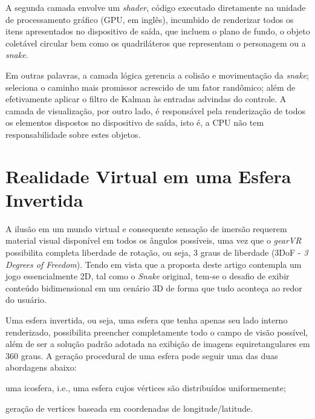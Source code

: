 \documentclass{vgtc}                          %
\begin{document}
A segunda camada envolve um \textit{shader}, código executado diretamente na unidade de processamento gráfico (GPU, em inglês), incumbido de renderizar todos os itens apresentados no dispositivo de saída, que incluem o plano de fundo, o objeto coletável circular bem como os quadriláteros que representam o personagem ou a \textit{snake}.

Em outras palavras, a camada lógica gerencia a colisão e movimentação da \textit{snake}; seleciona o caminho mais promissor acrescido de um fator randômico; além de efetivamente aplicar o filtro de Kalman às entradas advindas do controle. A camada de visualização, por outro lado, é responsável pela renderização de todos os elementos dispostos no dispositivo de saída, isto é, a CPU não tem responsabilidade sobre estes objetos.

\section{Realidade Virtual em uma Esfera Invertida} \label{sec:invertedsphere}

A ilusão em um mundo virtual e consequente sensação de imersão requerem material visual disponível em todos os ângulos possíveis, uma vez que o \textit{gearVR} possibilita completa liberdade de rotação, ou seja, 3 graus de liberdade (3DoF - \textit{3 Degrees of Freedom}). Tendo em vista que a proposta deste artigo contempla um jogo essencialmente 2D, tal como o \textit{Snake} original, tem-se o desafio de exibir conteúdo bidimensional em um cenário 3D de forma que tudo aconteça ao redor do usuário.

Uma esfera invertida, ou seja, uma esfera que tenha apenas seu lado interno renderizado, possibilita preencher completamente todo o campo de visão possível, além de ser a solução padrão adotada na exibição de imagens equiretangulares em 360 graus. A geração procedural de uma esfera pode seguir uma das duas abordagens abaixo:
\begin{enumerate}
  \begin{item} uma icosfera, i.e., uma esfera cujos vértices são distribuídos uniformemente; \end{item}
  \begin{item} geração de vertíces baseada em coordenadas de longitude/latitude. \end{item}
\end{enumerate}
\end{document}
